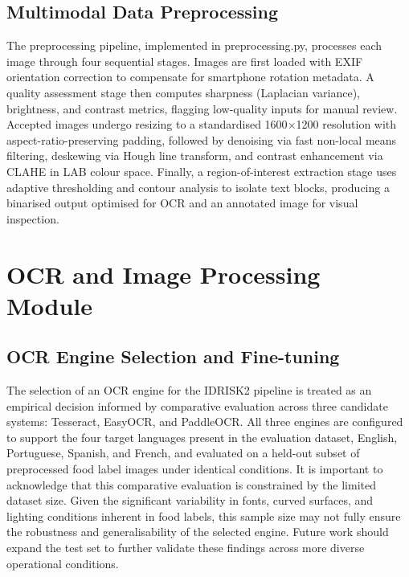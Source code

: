 \hypertarget{multimodal-data-preprocessing}{%
\subsection{Multimodal Data Preprocessing}\label{multimodal-data-preprocessing}}

The preprocessing pipeline, implemented in preprocessing.py, processes each image through four sequential stages. Images are first loaded with EXIF orientation correction to compensate for smartphone rotation metadata. A quality assessment stage then computes sharpness (Laplacian variance), brightness, and contrast metrics, flagging low-quality inputs for manual review. Accepted images undergo resizing to a standardised 1600\(\times\)1200 resolution with aspect-ratio-preserving padding, followed by denoising via fast non-local means filtering, deskewing via Hough line transform, and contrast enhancement via CLAHE in LAB colour space. Finally, a region-of-interest extraction stage uses adaptive thresholding and contour analysis to isolate text blocks, producing a binarised output optimised for OCR and an annotated image for visual inspection.

\hypertarget{ocr-and-image-processing-module}{%
\section{OCR and Image Processing Module}\label{ocr-and-image-processing-module}}

\hypertarget{ocr-engine-selection-and-fine-tuning}{%
\subsection{OCR Engine Selection and Fine-tuning}\label{ocr-engine-selection-and-fine-tuning}}

The selection of an OCR engine for the IDRISK2 pipeline is treated as an empirical decision informed by comparative evaluation across three candidate systems: Tesseract, EasyOCR, and PaddleOCR. All three engines are configured to support the four target languages present in the evaluation dataset, English, Portuguese, Spanish, and French, and evaluated on a held-out subset of preprocessed food label images under identical conditions. It is important to acknowledge that this comparative evaluation is constrained by the limited dataset size. Given the significant variability in fonts, curved surfaces, and lighting conditions inherent in food labels, this sample size may not fully ensure the robustness and generalisability of the selected engine. Future work should expand the test set to further validate these findings across more diverse operational conditions.

